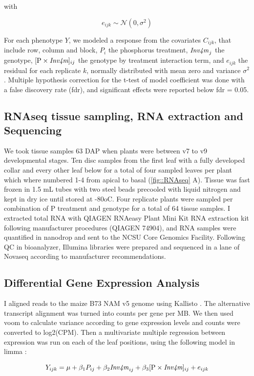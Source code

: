 with 

$$e_{ijk}\sim \mathcal{N} (0, {\sigma}^2)$$

For each phenotype $Y$, we modeled a response from the covariates $C_{ijk}$, that include row, column and block, $P_{i}$  the phosphorus treatment, $\text{\textit{Inv4m}}_{j}$ the \invfour genotype,  $[\text{P} \times \textit{\text{\textit{Inv4m}}}]_{ij}$ the genotype by treatment interaction term, and $e_{ijk}$ the residual for each replicate $k$, normally distributed with  mean zero and  variance $\sigma^2$.
Multiple hypothesis correction for the  t-test of model coefficient was done with a false discovery rate (fdr), and significant effects were reported below fdr = 0.05. 

\subsection{RNAseq tissue sampling, RNA extraction and Sequencing}
We took tissue samples 63 DAP when plants were between v7 to v9 developmental stages. 
Ten disc samples from the first leaf with a fully developed collar and every other leaf below for a total  of  four sampled leaves   per plant which where numbered 1-4 from apical to basal (\autoref{fig::RNAseq} A). 
Tissue was fast frozen in 1.5 mL tubes with two steel beads precooled with liquid nitrogen and kept in dry ice until stored at -80oC.
Four replicate plants were sampled per combination of  P treatment and \invfour genotype for a total of 64 tissue samples. 
I extracted total RNA with QIAGEN RNAeasy Plant Mini Kit  RNA extraction kit following manufacturer procedures (QIAGEN 74904), and RNA samples were quantified in nanodrop and sent to the NCSU Core Genomics Facility.
Following QC in bioanalyzer, Illumina libraries were prepared and sequenced in a lane of Novaseq according to manufacturer recommendations.


\subsection{Differential Gene Expression Analysis}
I aligned reads to the maize B73 NAM v5 genome using Kallisto \citep{bray2016}.
The alternative transcript alignment was turned into counts per gene per MB. We then used  voom  to calculate variance according to gene expression levels and counts were converted to log2(CPM). Then a  multivariate multiple regression between expression was run on each of the leaf positions, using the following model in limma :

$$Y_{ijk} = \mu + \beta_1 P_{ij}+ \beta_2 \text{\textit{Inv4m}}_{ij}+ \beta_3 [\text{P} \times \textit{\text{\textit{Inv4m}}}]_{ij} + e_{ijk}$$

